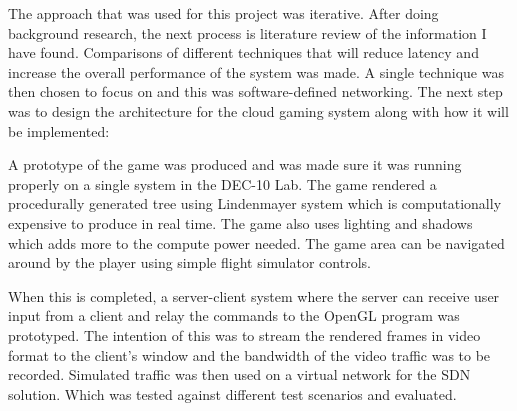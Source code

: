 The approach that was used for this project was iterative. After doing background research, the next process is literature review of the information I have found. Comparisons of different techniques that will reduce latency and increase the overall performance of the system was made. A single technique was then chosen to focus on and this was software-defined networking. The next step was to design the architecture for the cloud gaming system along with how it will be implemented:
\newline
\par
A prototype of the game was produced and was made sure it was running properly on a single system in the DEC-10 Lab. The game rendered a procedurally generated tree using Lindenmayer system which is computationally expensive to produce in real time. The game also uses lighting and shadows which adds more to the compute power needed. The game area can be navigated around by the player using simple flight simulator controls.
\newline
\par
When this is completed, a server-client system where the server can receive user input from a client and relay the commands to the OpenGL program was prototyped. The intention of this was to stream the rendered frames in video format to the client's window and the bandwidth of the video traffic was to be recorded. Simulated traffic was then used on a virtual network for the SDN solution. Which was tested against different test scenarios and evaluated.